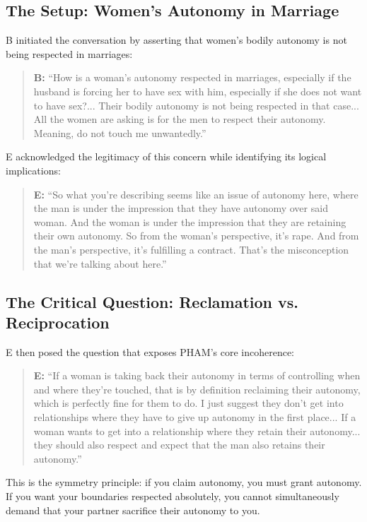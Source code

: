 \documentclass[12pt,openany]{book}
\numberwithin{equation}{chapter}
\begin{document}
\subsection{The Setup: Women's Autonomy in Marriage}

B initiated the conversation by asserting that women's bodily autonomy is not being respected in marriages:

\begin{quote}
\textbf{B:} ``How is a woman's autonomy respected in marriages, especially if the husband is forcing her to have sex with him, especially if she does not want to have sex?... Their bodily autonomy is not being respected in that case... All the women are asking is for the men to respect their autonomy. Meaning, do not touch me unwantedly.''
\end{quote}

E acknowledged the legitimacy of this concern while identifying its logical implications:

\begin{quote}
\textbf{E:} ``So what you're describing seems like an issue of autonomy here, where the man is under the impression that they have autonomy over said woman. And the woman is under the impression that they are retaining their own autonomy. So from the woman's perspective, it's rape. And from the man's perspective, it's fulfilling a contract. That's the misconception that we're talking about here.''
\end{quote}

\subsection{The Critical Question: Reclamation vs. Reciprocation}

E then posed the question that exposes PHAM's core incoherence:

\begin{quote}
\textbf{E:} ``If a woman is taking back their autonomy in terms of controlling when and where they're touched, that is by definition reclaiming their autonomy, which is perfectly fine for them to do. I just suggest they don't get into relationships where they have to give up autonomy in the first place... If a woman wants to get into a relationship where they retain their autonomy... they should also respect and expect that the man also retains their autonomy.''
\end{quote}

This is the symmetry principle: if you claim autonomy, you must grant autonomy. If you want your boundaries respected absolutely, you cannot simultaneously demand that your partner sacrifice their autonomy to you.
\end{document}
